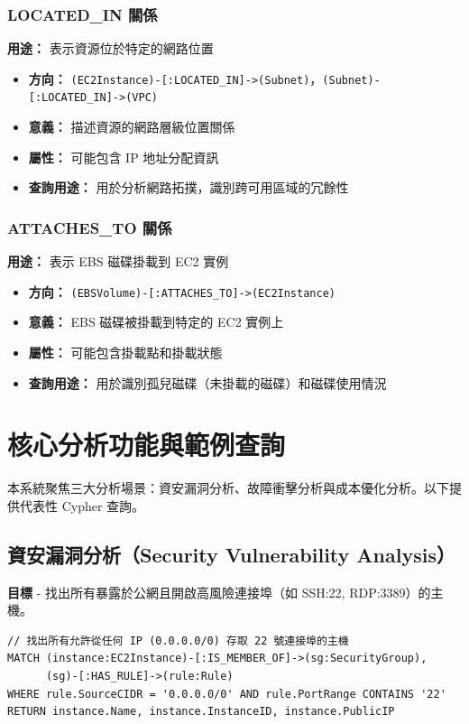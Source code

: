 \documentclass[11pt,a4paper]{ctexart}
\begin{document}
\subsubsection{LOCATED\_IN 關係}
\textbf{用途：} 表示資源位於特定的網路位置
\begin{itemize}[leftmargin=1.5em]
\item \textbf{方向：} \texttt{(EC2Instance)-[:LOCATED\_IN]->(Subnet)}，\texttt{(Subnet)-[:LOCATED\_IN]->(VPC)}
\item \textbf{意義：} 描述資源的網路層級位置關係
\item \textbf{屬性：} 可能包含 IP 地址分配資訊
\item \textbf{查詢用途：} 用於分析網路拓撲，識別跨可用區域的冗餘性
\end{itemize}

\subsubsection{ATTACHES\_TO 關係}
\textbf{用途：} 表示 EBS 磁碟掛載到 EC2 實例
\begin{itemize}[leftmargin=1.5em]
\item \textbf{方向：} \texttt{(EBSVolume)-[:ATTACHES\_TO]->(EC2Instance)}
\item \textbf{意義：} EBS 磁碟被掛載到特定的 EC2 實例上
\item \textbf{屬性：} 可能包含掛載點和掛載狀態
\item \textbf{查詢用途：} 用於識別孤兒磁碟（未掛載的磁碟）和磁碟使用情況
\end{itemize}


\section{核心分析功能與範例查詢}\label{sec:analysis}
本系統聚焦三大分析場景：資安漏洞分析、故障衝擊分析與成本優化分析。以下提供代表性 Cypher 查詢。

\subsection{資安漏洞分析（Security Vulnerability Analysis）}
\textbf{目標} - 找出所有暴露於公網且開啟高風險連接埠（如 SSH:22, RDP:3389）的主機。

\begin{lstlisting}[language=Cypher,caption={尋找允許 0.0.0.0/0 存取 22 埠之主機}]
// 找出所有允許從任何 IP (0.0.0.0/0) 存取 22 號連接埠的主機
MATCH (instance:EC2Instance)-[:IS_MEMBER_OF]->(sg:SecurityGroup),
      (sg)-[:HAS_RULE]->(rule:Rule)
WHERE rule.SourceCIDR = '0.0.0.0/0' AND rule.PortRange CONTAINS '22'
RETURN instance.Name, instance.InstanceID, instance.PublicIP
\end{lstlisting}
\end{document}
